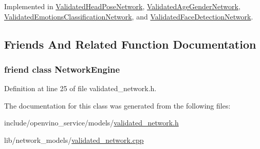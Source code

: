 Implemented in \hyperlink{classValidatedHeadPoseNetwork_a35f7c37270398f1ac06d342a73b29f62}{Validated\+Head\+Pose\+Network}, \hyperlink{classValidatedAgeGenderNetwork_a5c39aa39e7cc3abf984a29bdf9e61d47}{Validated\+Age\+Gender\+Network}, \hyperlink{classValidatedEmotionsClassificationNetwork_a1ee0df076b78a08a00bf9447e9130d09}{Validated\+Emotions\+Classification\+Network}, and \hyperlink{classValidatedFaceDetectionNetwork_ac24b2e9e36a06c4f9a8db5bf1aa7a8c7}{Validated\+Face\+Detection\+Network}.



\subsection{Friends And Related Function Documentation}
\subsubsection[{\texorpdfstring{Network\+Engine}{NetworkEngine}}]{\setlength{\rightskip}{0pt plus 5cm}friend class {\bf Network\+Engine}\hspace{0.3cm}{\ttfamily [friend]}}\hypertarget{classValidatedBaseNetwork_ab76946120683c05c183e6deb983ac468}{}\label{classValidatedBaseNetwork_ab76946120683c05c183e6deb983ac468}


Definition at line 25 of file validated\+\_\+network.\+h.



The documentation for this class was generated from the following files\+:\begin{DoxyCompactItemize}
\item 
include/openvino\+\_\+service/models/\hyperlink{validated__network_8h}{validated\+\_\+network.\+h}\item 
lib/network\+\_\+models/\hyperlink{validated__network_8cpp}{validated\+\_\+network.\+cpp}\end{DoxyCompactItemize}

